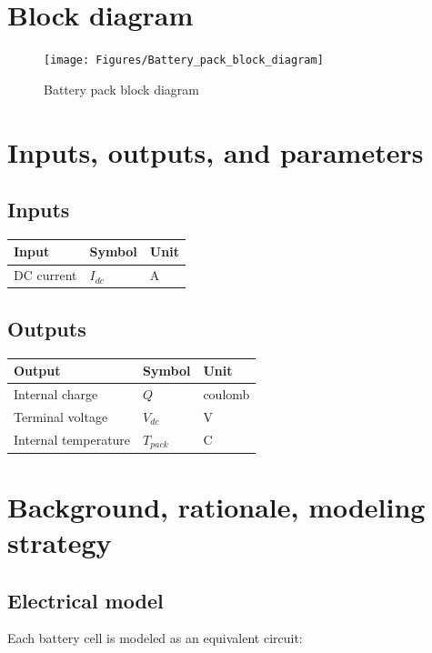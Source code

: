 \documentclass{article}
\begin{document}
\section{Block diagram}
	\begin{figure}[h!]
			\centering
			\texttt{[image: Figures/Battery\_pack\_block\_diagram]}
			\caption{Battery pack block diagram}
			\label{fig:battery_pack_equivalent_circuit}
	\end{figure}
	\FloatBarrier

\section{Inputs, outputs, and parameters}
	\subsection{Inputs}
	\begin{tabular}{ l | l | l  }
		Input					&	Symbol		&	Unit		\\	\hline
		DC current			&	$I_{dc}$		&	A		\\
	\end{tabular}
	
	\subsection{Outputs}
	\begin{tabular}{ l | l | l  }
		Output					&	Symbol		&	Unit		\\	\hline
		Internal charge				&	$Q$			&	coulomb	\\
		Terminal voltage			&	$V_{dc}$		&	V		\\
		Internal temperature			&	$T_{pack}$	&	\degree C	\\
	\end{tabular}
		
\section{Background, rationale, modeling strategy}
	\subsection{Electrical model}
		Each battery cell is modeled as an equivalent circuit:
		
\end{document}
